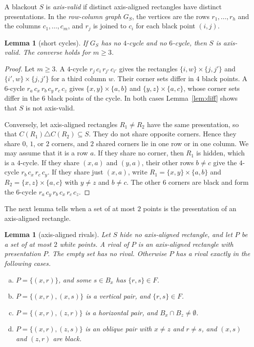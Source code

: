 \documentclass[12pt]{article}
\theoremstyle{plain}
\newtheorem{lemma}[theorem]{Lemma}
\theoremstyle{definition}
\theoremstyle{remark}
\begin{document}
A blackout $S$ is \emph{axis-valid} if distinct axis-aligned rectangles have
distinct presentations. In the \emph{row-column graph} $G_S$, the vertices are
the rows $r_1,\dots,r_h$ and the columns $c_1,\dots,c_m$, and $r_j$ is joined to
$c_i$ for each black point $(i,j)$.

\begin{lemma}[short cycles]\label{lem:girth}
If $G_S$ has no $4$-cycle and no $6$-cycle, then $S$ is axis-valid. The converse
holds for $m\ge3$.
\end{lemma}

\begin{proof}
Let $m\ge3$. A $4$-cycle $r_j\,c_i\,r_{j'}\,c_{i'}$ gives the rectangles
$\{i,w\}\times\{j,j'\}$ and $\{i',w\}\times\{j,j'\}$ for a third column $w$.
Their corner sets differ in $4$ black points. A $6$-cycle
$r_a\,c_x\,r_b\,c_y\,r_c\,c_z$ gives $\{x,y\}\times\{a,b\}$ and
$\{y,z\}\times\{a,c\}$, whose corner sets differ in the $6$ black points of the
cycle. In both cases Lemma~\ref{lem:diff} shows that $S$ is not axis-valid.

Conversely, let axis-aligned rectangles $R_1\ne R_2$ have the same presentation,
so that $C(R_1)\triangle C(R_2)\subseteq S$. They do not share opposite corners.
Hence they share $0$, $1$, or $2$ corners, and $2$ shared corners lie in one row
or in one column. We may assume that it is a row $a$. If they share no corner,
then $R_1$ is hidden, which is a $4$-cycle. If they share $(x,a)$ and $(y,a)$,
their other rows $b\ne c$ give the $4$-cycle $r_b\,c_x\,r_c\,c_y$. If they share
just $(x,a)$, write $R_1=\{x,y\}\times\{a,b\}$ and $R_2=\{x,z\}\times\{a,c\}$
with $y\ne z$ and $b\ne c$. The other $6$ corners are black and form the
$6$-cycle $r_a\,c_y\,r_b\,c_x\,r_c\,c_z$.
\end{proof}

The next lemma tells when a set of at most $2$ points is the presentation of
an axis-aligned rectangle.

\begin{lemma}[axis-aligned rivals]\label{lem:rival}
Let $S$ hide no axis-aligned rectangle, and let $P$ be a set of at most $2$
white points. A \emph{rival} of $P$ is an axis-aligned rectangle with
presentation $P$. The empty set has no rival. Otherwise $P$ has a rival exactly
in the following cases.
\begin{enumerate}[(a)]
\item $P=\{(x,r)\}$, and some $s\in B_x$ has $\{r,s\}\in F$.
\item $P=\{(x,r),(x,s)\}$ is a vertical pair, and $\{r,s\}\in F$.
\item $P=\{(x,r),(z,r)\}$ is a horizontal pair, and $B_x\cap B_z\ne\emptyset$.
\item $P=\{(x,r),(z,s)\}$ is an oblique pair with $x\ne z$ and $r\ne s$, and
$(x,s)$ and $(z,r)$ are black.
\end{enumerate}
\end{lemma}
\end{document}
